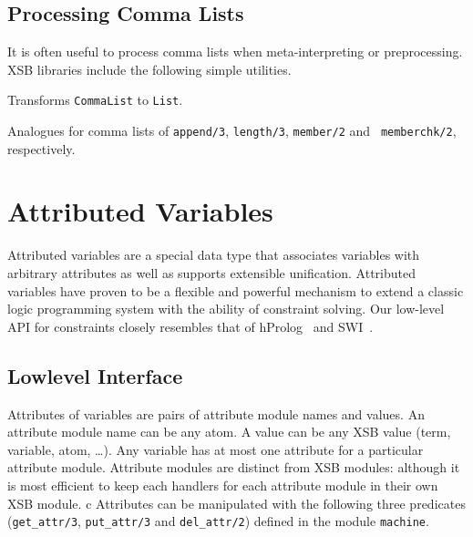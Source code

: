 \subsection{Processing Comma Lists}

It is often useful to process comma lists when meta-interpreting or
preprocessing.  XSB libraries include the following simple utilities.

\begin{description}

%
Transforms {\tt CommaList} to {\tt List}.

%
%
%
%
Analogues for comma lists of {\tt append/3}, {\tt length/3}, {\tt member/2} and {\tt
memberchk/2}, respectively.

\end{description}
	
\section{Attributed Variables} \label{sec:attributed-variables}

%
Attributed variables are a special data type that associates variables
with arbitrary attributes as well as supports extensible unification.
Attributed variables have proven to be a flexible and powerful
mechanism to extend a classic logic programming system with the
ability of constraint solving.  Our low-level API for constraints
closely resembles that of hProlog~\cite{hprolog} and
SWI~\cite{SWI-manual}.

\subsection{Lowlevel Interface}
%
Attributes of variables are pairs of attribute module names and
values.  An attribute module name can be any atom.  A value can be any
XSB value (term, variable, atom, \ldots). Any variable has at most one
attribute for a particular attribute module.  Attribute modules are
distinct from XSB modules: although it is most efficient to keep each
handlers for each attribute module in their own XSB module.
c
Attributes can be manipulated with the following three predicates
(\texttt{get\_attr/3}, \texttt{put\_attr/3} and \texttt{del\_attr/2})
defined in the module \texttt{machine}.

